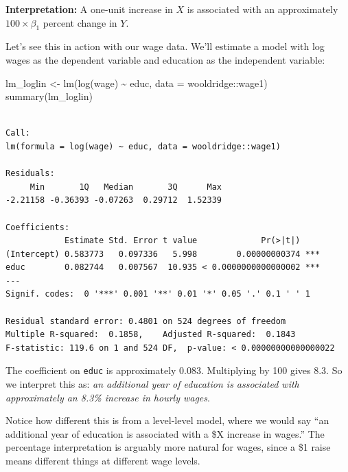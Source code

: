 \documentclass[
  letterpaper,
  DIV=11,
  numbers=noendperiod]{scrreprt}
\newenvironment{Shaded}{\begin{snugshade}}{\end{snugshade}}
\newcommand{\AttributeTok}[1]{\textcolor[rgb]{0.40,0.45,0.13}{#1}}
\newcommand{\FunctionTok}[1]{\textcolor[rgb]{0.28,0.35,0.67}{#1}}
\newcommand{\NormalTok}[1]{\textcolor[rgb]{0.00,0.23,0.31}{#1}}
\newcommand{\OtherTok}[1]{\textcolor[rgb]{0.00,0.23,0.31}{#1}}
\newcommand{\SpecialCharTok}[1]{\textcolor[rgb]{0.37,0.37,0.37}{#1}}
\begin{document}
\textbf{Interpretation:} A one-unit increase in \(X\) is associated with
an approximately \(100 \times \beta_1\) percent change in \(Y\).

Let's see this in action with our wage data. We'll estimate a model with
log wages as the dependent variable and education as the independent
variable:

\begin{Shaded}
\begin{Highlighting}[]
\NormalTok{lm\_loglin }\OtherTok{\textless{}{-}} \FunctionTok{lm}\NormalTok{(}\FunctionTok{log}\NormalTok{(wage) }\SpecialCharTok{\textasciitilde{}}\NormalTok{ educ, }\AttributeTok{data =}\NormalTok{ wooldridge}\SpecialCharTok{::}\NormalTok{wage1)}
\FunctionTok{summary}\NormalTok{(lm\_loglin)}
\end{Highlighting}
\end{Shaded}

\begin{verbatim}

Call:
lm(formula = log(wage) ~ educ, data = wooldridge::wage1)

Residuals:
     Min       1Q   Median       3Q      Max 
-2.21158 -0.36393 -0.07263  0.29712  1.52339 

Coefficients:
            Estimate Std. Error t value             Pr(>|t|)    
(Intercept) 0.583773   0.097336   5.998        0.00000000374 ***
educ        0.082744   0.007567  10.935 < 0.0000000000000002 ***
---
Signif. codes:  0 '***' 0.001 '**' 0.01 '*' 0.05 '.' 0.1 ' ' 1

Residual standard error: 0.4801 on 524 degrees of freedom
Multiple R-squared:  0.1858,    Adjusted R-squared:  0.1843 
F-statistic: 119.6 on 1 and 524 DF,  p-value: < 0.00000000000000022
\end{verbatim}

The coefficient on \texttt{educ} is approximately 0.083. Multiplying by
100 gives 8.3. So we interpret this as: \emph{an additional year of
education is associated with approximately an 8.3\% increase in hourly
wages}.

Notice how different this is from a level-level model, where we would
say ``an additional year of education is associated with a \$X increase
in wages.'' The percentage interpretation is arguably more natural for
wages, since a \$1 raise means different things at different wage
levels.
\end{document}
